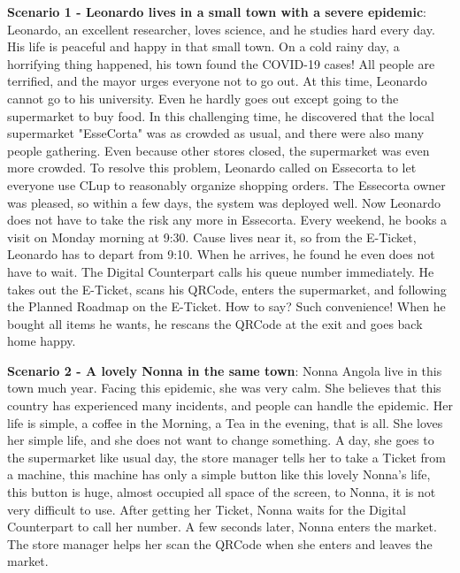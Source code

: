 \documentclass[a4paper,12pt]{report}
\begin{document}
\textbf{Scenario 1 - Leonardo lives in a small town with a severe epidemic}: Leonardo, an excellent researcher, loves science, and he studies hard every day. His life is peaceful and happy in that small town. On a cold rainy day, a horrifying thing happened, his town found the COVID-19 cases! All people are terrified, and the mayor urges everyone not to go out. At this time, Leonardo cannot go to his university. Even he hardly goes out except going to the supermarket to buy food. In this challenging time, he discovered that the local supermarket "EsseCorta" was as crowded as usual, and there were also many people gathering. Even because other stores closed, the supermarket was even more crowded. To resolve this problem, Leonardo called on Essecorta to let everyone use CLup to reasonably organize shopping orders. The Essecorta owner was pleased, so within a few days, the system was deployed well.
Now Leonardo does not have to take the risk any more in Essecorta. Every weekend, he books a visit on Monday morning at 9:30. Cause lives near it, so from the E-Ticket, Leonardo has to depart from 9:10. When he arrives, he found he even does not have to wait. The Digital Counterpart calls his queue number immediately. He takes out the E-Ticket, scans his QRCode, enters the supermarket, and following the Planned Roadmap on the E-Ticket. How to say? Such convenience! When he bought all items he wants, he rescans the QRCode at the exit and goes back home happy.


\textbf{Scenario 2 - A lovely Nonna in the same town}: Nonna Angola live in this town much year. Facing this epidemic, she was very calm. She believes that this country has experienced many incidents, and people can handle the epidemic. Her life is simple, a coffee in the Morning, a Tea in the evening, that is all. She loves her simple life, and she does not want to change something. A day, she goes to the supermarket like usual day, the store manager tells her to take a Ticket from a machine, this machine has only a simple button like this lovely Nonna's life, this button is huge, almost occupied all space of the screen, to Nonna, it is not very difficult to use. After getting her Ticket, Nonna waits for the Digital Counterpart to call her number. A few seconds later, Nonna enters the market. The store manager helps her scan the QRCode when she enters and leaves the market.
\end{document}
